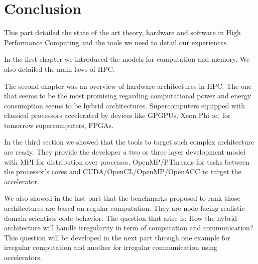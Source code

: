 









\chapter*{Conclusion}
This part detailed the state of the art theory, hardware and software in High Performance Computing and the tools we need to detail our experiences.

In the first chapter we introduced the models for computation and memory. 
We also detailed the main laws of HPC. 

The second chapter was an overview of hardware architectures in HPC. 
The one that seems to be the most promising regarding computational power and energy consumption seems to be hybrid architectures. 
Supercomputers equipped with classical processors accelerated by devices like GPGPUs, Xeon Phi or, for tomorrow supercomputers, FPGAs. 

In the third section we showed that the tools to target such complex architecture are ready. 
They provide the developer a two or three layer development model with MPI for distribution over processes, OpenMP/PThreads for tasks between the processor's cores and CUDA/OpenCL/OpenMP/OpenACC to target the accelerator. 

We also showed in the last part that the benchmarks proposed to rank those architectures are based on regular computation. 
They are node facing realistic domain scientists code behavior. 
The question that arise is: How the hybrid architecture will handle irregularity in term of computation and communication? 
This question will be developed in the next part through one example for irregular computation and another for irregular communication using accelerators. 



